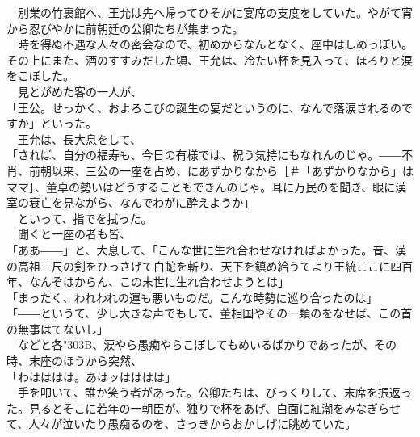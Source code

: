 \documentclass[
  paper=a5,
  fontsize=10pt,
  jafontsize=9.5pt,
  tate,                  %
  open_bracket_pos=nibu, %
]{jlreq}
\begin{document}
　別業の竹裏館へ、王允は先へ帰ってひそかに宴席の支度をしていた。やがて宵から忍びやかに前朝廷の公卿たちが集まった。\\


　時を得ぬ不遇な人々の密会なので、初めからなんとなく、座中はしめっぽい。その上にまた、酒のすすみだした頃、王允は、冷たい杯を見入って、ほろりと涙をこぼした。\\


　見とがめた客の一人が、\\


「王公。せっかく、およろこびの誕生の宴だというのに、なんで落涙されるのですか」といった。\\


　王允は、長大息をして、\\


「されば、自分の福寿も、今日の有様では、祝う気持にもなれんのじゃ。――不肖、前朝以来、三公の一座を占め、にあずかりなから［＃「あずかりなから」はママ］、董卓の勢いはどうすることもできんのじゃ。耳に万民のを聞き、眼に漢室の衰亡を見ながら、なんでわがに酔えようか」\\


　といって、指でを拭った。\\


　聞くと一座の者も皆、\\


「ああ――」と、大息して、「こんな世に生れ合わせなければよかった。昔、漢の高祖三尺の剣をひっさげて白蛇を斬り、天下を鎮め給うてより王統ここに四百年、なんぞはからん、この末世に生れ合わせようとは」\\


「まったく、われわれの運も悪いものだ。こんな時勢に巡り合ったのは」\\


「――というて、少し大きな声でもして、董相国やその一類のをなせば、この首の無事はてないし」\\


　などと各{\char"303B}、涙やら愚痴やらこぼしてもめいるばかりであったが、その時、末座のほうから突然、\\


「わはははは。あはッはははは」\\


　手を叩いて、誰か笑う者があった。公卿たちは、びっくりして、末席を振返った。見るとそこに若年の一朝臣が、独りで杯をあげ、白面に紅潮をみなぎらせて、人々が泣いたり愚痴るのを、さっきからおかしげに眺めていた。\\
\end{document}
